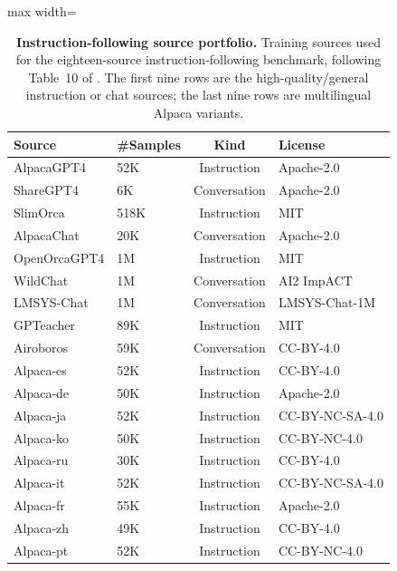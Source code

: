 \documentclass{article}
\theoremstyle{normaltheorem}
\begin{document}
\begin{table}[t]
  \centering
  \caption{\textbf{Instruction-following source portfolio.}
  Training sources used for the eighteen-source instruction-following benchmark, following Table~10 of \citet{pan2025scalebio}. The first nine rows are the high-quality/general instruction or chat sources; the last nine rows are multilingual Alpaca variants.}
  \label{tab:instr-source-portfolio}
  \begin{adjustbox}{max width=\textwidth}
  \begin{tabular}{llcl}
    \toprule
    Source & \#Samples & Kind & License \\
    \midrule
    AlpacaGPT4 & 52K & Instruction & Apache-2.0 \\
    ShareGPT4 & 6K & Conversation & Apache-2.0 \\
    SlimOrca & 518K & Instruction & MIT \\
    AlpacaChat & 20K & Conversation & Apache-2.0 \\
    OpenOrcaGPT4 & 1M & Instruction & MIT \\
    WildChat & 1M & Conversation & AI2 ImpACT \\
    LMSYS-Chat & 1M & Conversation & LMSYS-Chat-1M \\
    GPTeacher & 89K & Instruction & MIT \\
    Airoboros & 59K & Conversation & CC-BY-4.0 \\
    \midrule
    Alpaca-es & 52K & Instruction & CC-BY-4.0 \\
    Alpaca-de & 50K & Instruction & Apache-2.0 \\
    Alpaca-ja & 52K & Instruction & CC-BY-NC-SA-4.0 \\
    Alpaca-ko & 50K & Instruction & CC-BY-NC-4.0 \\
    Alpaca-ru & 30K & Instruction & CC-BY-4.0 \\
    Alpaca-it & 52K & Instruction & CC-BY-NC-SA-4.0 \\
    Alpaca-fr & 55K & Instruction & Apache-2.0 \\
    Alpaca-zh & 49K & Instruction & CC-BY-4.0 \\
    Alpaca-pt & 52K & Instruction & CC-BY-NC-4.0 \\
    \bottomrule
  \end{tabular}
  \end{adjustbox}
\end{table}
\end{document}

